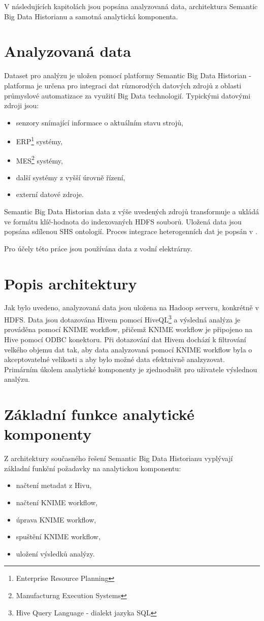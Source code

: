 \documentclass[11pt,twoside,a4paper]{book}
\begin{document}
	V následujících kapitolách jsou popsána analyzovaná data, architektura Semantic Big Data Historianu a samotná analytická komponenta.

	\section{Analyzovaná data}
		Dataset pro analýzu je uložen pomocí platformy Semantic Big Data Historian - platforma je určena pro integraci dat různorodých datových zdrojů z oblasti průmyslové automatizace za využití Big Data technologií. Typickými datovými zdroji jsou:
\begin{itemize}
\item senzory snímající informace o aktuálním stavu strojů,
\item ERP\footnote{Enterprise Resource Planning} systémy,
\item MES\footnote{Manufacturng Execution Systems} systémy,
\item další systémy z vyšší úrovně řízení,
\item externí datové zdroje.
\end{itemize}
		Semantic Big Data Historian data z výše uvedených zdrojů transformuje a ukládá ve formátu klíč-hodnota do indexovaných HDFS souborů. Uložená data jsou popsána sdílenou SHS ontologií. Proces integrace heterogenních dat je popsán v \cite{historian01}.

		Pro účely této práce jsou používána data z vodní elektrárny. 

	\section{Popis architektury}
		Jak bylo uvedeno, analyzovaná data jsou uložena na Hadoop serveru, konkrétně v HDFS. Data jsou dotazována Hivem pomocí HiveQL\footnote{Hive Query Language - dialekt jazyka SQL}\cite{hiveql01} a výsledná analýza je prováděna pomocí KNIME workflow, přičemž KNIME workflow je připojeno na Hive pomocí ODBC konektoru. Při dotazování dat Hivem dochází k filtrování velkého objemu dat tak, aby data analyzovaná pomocí KNIME workflow byla o akceptovatelné velikosti a aby bylo možné data efektnivně analzyzovat. Primárním úkolem analytické komponenty je zjednodušit pro uživatele výslednou analýzu.

        \section{Základní funkce analytické komponenty}
		Z architektury současného řešení Semantic Big Data Historianu vyplývají základní funkční požadavky na analytickou komponentu:
\begin{itemize}
\item načtení metadat z Hivu,
\item načtení KNIME workflow,
\item úprava KNIME workflow,
\item spuštění KNIME workflow,
\item uložení výsledků analýzy.
\end{itemize}
\end{document}
